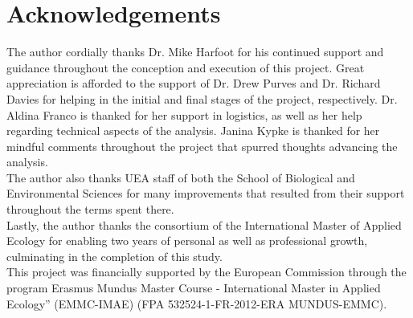 \section*{Acknowledgements}
\label{Acknowledgements}
\onehalfspacing
The author cordially thanks Dr. Mike Harfoot for his continued support and guidance throughout the conception and execution of this project. Great appreciation is afforded to the support of Dr. Drew Purves and Dr. Richard Davies for helping in the initial and final stages of the project, respectively. Dr. Aldina Franco is thanked for her support in logistics, as well as her help regarding technical aspects of the analysis. Janina Kypke is thanked for her mindful comments throughout the project that spurred thoughts advancing the analysis. \\
The author also thanks UEA staff of both the School of Biological and Environmental Sciences for many improvements that resulted from their support throughout the terms spent there.\\
Lastly, the author thanks the consortium of the International Master of Applied Ecology for enabling two years of personal as well as professional growth, culminating in the completion of this study.\\
This project was financially supported by the European Commission through the program Erasmus Mundus Master Course - International Master in Applied Ecology” (EMMC-IMAE) (FPA 532524-1-FR-2012-ERA MUNDUS-EMMC).